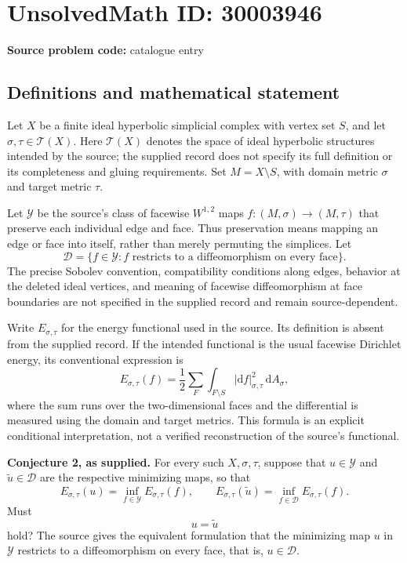 \documentclass[11pt]{article}
\begin{document}
\section*{UnsolvedMath ID: 30003946}
\textbf{Source problem code:} catalogue entry
\subsection{Definitions and mathematical statement}
Let \(X\) be a finite ideal hyperbolic simplicial complex with vertex set \(S\), and let \(\sigma,\tau\in\mathcal T(X)\). Here \(\mathcal T(X)\) denotes the space of ideal hyperbolic structures intended by the source; the supplied record does not specify its full definition or its completeness and gluing requirements. Set \(M=X\setminus S\), with domain metric \(\sigma\) and target metric \(\tau\).

Let \(\mathcal Y\) be the source's class of facewise \(W^{1,2}\) maps \(f:(M,\sigma)\to(M,\tau)\) that preserve each individual edge and face. Thus preservation means mapping an edge or face into itself, rather than merely permuting the simplices. Let
\[
\mathcal D=\{f\in\mathcal Y: f\text{ restricts to a diffeomorphism on every face}\}.
\]
The precise Sobolev convention, compatibility conditions along edges, behavior at the deleted ideal vertices, and meaning of facewise diffeomorphism at face boundaries are not specified in the supplied record and remain source-dependent.

Write \(E_{\sigma,\tau}\) for the energy functional used in the source. Its definition is absent from the supplied record. If the intended functional is the usual facewise Dirichlet energy, its conventional expression is
\[
E_{\sigma,\tau}(f)=\frac12\sum_{F}\int_{F\setminus S}|\mathrm df|_{\sigma,\tau}^{2}\,\mathrm dA_{\sigma},
\]
where the sum runs over the two-dimensional faces and the differential is measured using the domain and target metrics. This formula is an explicit conditional interpretation, not a verified reconstruction of the source's functional.

\textbf{Conjecture 2, as supplied.} For every such \(X,\sigma,\tau\), suppose that \(u\in\mathcal Y\) and \(\widetilde u\in\mathcal D\) are the respective minimizing maps, so that
\[
E_{\sigma,\tau}(u)=\inf_{f\in\mathcal Y}E_{\sigma,\tau}(f),\qquad
E_{\sigma,\tau}(\widetilde u)=\inf_{f\in\mathcal D}E_{\sigma,\tau}(f).
\]
Must
\[
u=\widetilde u
\]
hold? The source gives the equivalent formulation that the minimizing map \(u\) in \(\mathcal Y\) restricts to a diffeomorphism on every face, that is, \(u\in\mathcal D\).
\end{document}
